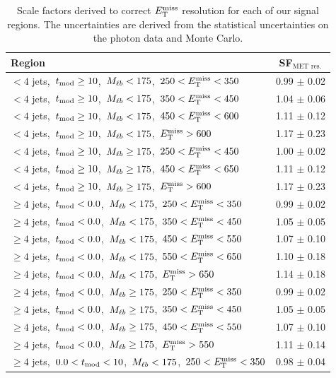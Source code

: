 \begin{table}[htbp]
\centering
\caption{Scale factors derived to correct $E_\text{T}^\text{miss}$ resolution for each
  of our signal regions. The uncertainties are derived from the
  statistical uncertainties on the photon data and Monte Carlo.}
\label{tab:metres:scalefactors}
\begin{tabular}{|l|c|}
\hline
Region  &  SF$_\text{MET res.}$ \\
\hline
$<4$ jets,~$t_\text{mod} \ge10$,~$M_{\ell b}<175$,~$250<E_\text{T}^\text{miss}<350$        &  0.99 $\pm$ 0.02 \\
$<4$ jets,~$t_\text{mod} \ge10$,~$M_{\ell b}<175$,~$350<E_\text{T}^\text{miss}<450$        &  1.04 $\pm$ 0.06 \\
$<4$ jets,~$t_\text{mod} \ge10$,~$M_{\ell b}<175$,~$450<E_\text{T}^\text{miss}<600$        &  1.11 $\pm$ 0.12 \\
$<4$ jets,~$t_\text{mod} \ge10$,~$M_{\ell b}<175$,~$E_\text{T}^\text{miss}>600$            &  1.17 $\pm$ 0.23 \\
\hline
$<4$ jets,~$t_\text{mod} \ge10$,~$M_{\ell b}\ge175$,~$250<E_\text{T}^\text{miss}<450$      &  1.00 $\pm$ 0.02 \\
$<4$ jets,~$t_\text{mod} \ge10$,~$M_{\ell b}\ge175$,~$450<E_\text{T}^\text{miss}<650$      &  1.11 $\pm$ 0.12 \\
$<4$ jets,~$t_\text{mod} \ge10$,~$M_{\ell b}\ge175$,~$E_\text{T}^\text{miss}>600$          &  1.17 $\pm$ 0.23 \\
\hline
$\ge4$ jets,~$t_\text{mod} <0.0$,~$M_{\ell b}<175$,~$250<E_\text{T}^\text{miss}<350$       &  0.99 $\pm$ 0.02 \\
$\ge4$ jets,~$t_\text{mod} <0.0$,~$M_{\ell b}<175$,~$350<E_\text{T}^\text{miss}<450$       &  1.05 $\pm$ 0.05 \\
$\ge4$ jets,~$t_\text{mod} <0.0$,~$M_{\ell b}<175$,~$450<E_\text{T}^\text{miss}<550$       &  1.07 $\pm$ 0.10 \\
$\ge4$ jets,~$t_\text{mod} <0.0$,~$M_{\ell b}<175$,~$550<E_\text{T}^\text{miss}<650$       &  1.10 $\pm$ 0.18 \\
$\ge4$ jets,~$t_\text{mod} <0.0$,~$M_{\ell b}<175$,~$E_\text{T}^\text{miss}>650$           &  1.14 $\pm$ 0.18 \\
\hline
$\ge4$ jets,~$t_\text{mod} <0.0$,~$M_{\ell b}\ge175$,~$250<E_\text{T}^\text{miss}<350$     &  0.99 $\pm$ 0.02 \\
$\ge4$ jets,~$t_\text{mod} <0.0$,~$M_{\ell b}\ge175$,~$350<E_\text{T}^\text{miss}<450$     &  1.05 $\pm$ 0.05 \\
$\ge4$ jets,~$t_\text{mod} <0.0$,~$M_{\ell b}\ge175$,~$450<E_\text{T}^\text{miss}<550$     &  1.07 $\pm$ 0.10 \\
$\ge4$ jets,~$t_\text{mod} <0.0$,~$M_{\ell b}\ge175$,~$E_\text{T}^\text{miss}>550$         &  1.11 $\pm$ 0.14 \\
\hline
$\ge4$ jets,~$0.0< t_\text{mod} <10$,~$M_{\ell b}<175$,~$250<E_\text{T}^\text{miss}<350$   &  0.98 $\pm$ 0.04 \\

\end{tabular}
\end{table}
